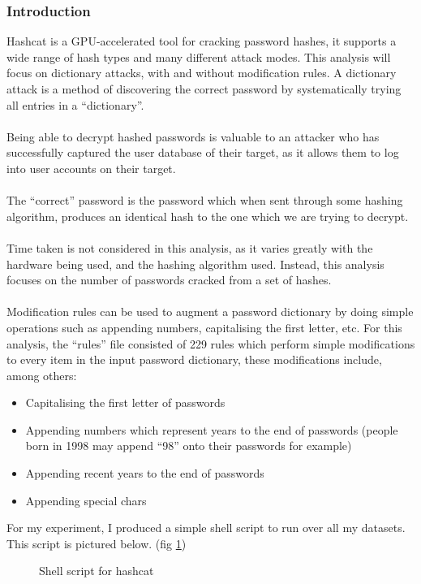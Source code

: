 \documentclass[11pt]{article}
\begin{document}
\subsubsection{Introduction}
Hashcat is a GPU-accelerated tool for cracking password hashes, it supports a wide range of hash types and many different attack modes.
This analysis will focus on dictionary attacks, with and without modification rules.
A dictionary attack is a method of discovering the correct password by systematically trying all entries in a ``dictionary''.\\\\
Being able to decrypt hashed passwords is valuable to an attacker who has successfully captured the user database of their target, as it allows them to log into user accounts on their target.\\\\
The ``correct'' password is the password which when sent through some hashing algorithm, produces an identical hash to the one which we are trying to decrypt.\\\\
Time taken is not considered in this analysis, as it varies greatly with the hardware being used, and the hashing algorithm used.
Instead, this analysis focuses on the number of passwords cracked from a set of hashes.\\\\
Modification rules can be used to augment a password dictionary by doing simple operations such as appending numbers, capitalising the first letter, etc.
For this analysis, the ``rules'' file consisted of 229 rules which perform simple modifications to every item in the input password dictionary, these modifications include, among others:
\begin{itemize}
\item Capitalising the first letter of passwords
\item Appending numbers which represent years to the end of passwords (people born in 1998 may append ``98'' onto their passwords for example)
\item Appending recent years to the end of passwords
\item Appending special chars
\end{itemize}
For my experiment, I produced a simple shell script to run over all my datasets. This script is pictured below. (fig \ref{fig:sh})
\begin{center}
\begin{figure}
 \caption{Shell script for hashcat} \label{fig:sh}
\end{figure}
\end{center}
\end{document}
